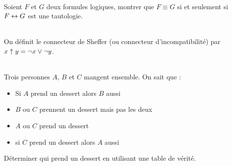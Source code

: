 \documentclass[11pt,a4paper]{article}
\begin{document}
\begin{Exercise}[title = {Où on trouve $\eq$, $\equiv$ et $\Leftrightarrow$}]\\
	Soient $F$ et $G$ deux formules logiques, montrer que $ F \equiv G$ si et seulement si $F \leftrightarrow G$ est une tautologie.
\end{Exercise}

\begin{Exercise}[title = {connecteur de Sheffer}]\\
	On définit le connecteur de Sheffer (ou connecteur d'incompatibilité) par $x \uparrow y = \neg x \vee \neg y$.

\end{Exercise}

\begin{Exercise}[title = {qui prend un dessert ?}] \\
	Trois personnes $A$, $B$ et $C$ mangent ensemble. On sait que :
	\begin{itemize}
		\item Si $A$ prend un dessert alors $B$ aussi
		\item $B$ ou $C$ prennent un dessert mais pas les deux
		\item $A$ ou $C$ prend un dessert
		\item si $C$ prend un dessert alors $A$ aussi
	\end{itemize}
	Déterminer qui prend un dessert en utilisant une table de vérité.
\end{Exercise}
\end{document}
